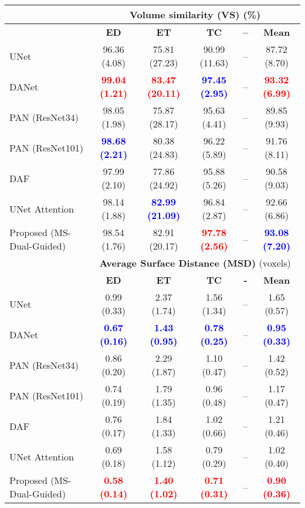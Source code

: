 \documentclass[journal]{IEEEtran}
\begin{document}
\begin{table*}[t!]
\begin{tabular}{lcccc|c}
\midrule
& \multicolumn{5}{c}{\textbf{Volume similarity (VS)} (\%)}\\
 \midrule
 & \textbf{ED} & \textbf{ET} & \textbf{TC} & \textbf{--} & \textbf{Mean}  \\
 \midrule
UNet \cite{ronneberger2015u}  &  96.36 (4.08)& 75.81 (27.23)& 90.99  (11.63)& --& 87.72 (8.70)\\
DANet \cite{fu2018dual}  &  \textcolor{red}{\textbf{99.04 (1.21)}} & \textcolor{red}{\textbf{83.47 (20.11)}}& \textcolor{blue}{\textbf{97.45 (2.95)}} & --& \textcolor{red}{\textbf{93.32 (6.99)}}  \\
PAN (ResNet34) \cite{li2018pyramid}   &  98.05 (1.98)& 75.87 (28.17)& 95.63 (4.41)& -- & 89.85 (9.93)  \\
PAN (ResNet101) \cite{li2018pyramid}   &  \textcolor{blue}{\textbf{98.68 (2.21)}} & 80.38 (24.83)& 96.22 (5.89) & -- & 91.76 (8.11)\\
DAF \cite{wang18d}  &  97.99 (2.10) & 77.86 (24.92) & 95.88 (5.26) & -- &   90.58 (9.03)  \\
UNet Attention \cite{schlemper2019attention}  &   98.14 (1.88) & \textcolor{blue}{\textbf{82.99 (21.09)}}& 96.84 (2.87) & -- &  92.66 (6.86)  \\
Proposed (MS-Dual-Guided)  & 98.54 (1.76) & 82.91 (20.17) &  \textcolor{red}{\textbf{97.78 (2.56)}} &-- & \textcolor{blue}{\textbf{93.08 (7.20)}} \\
\midrule
& \multicolumn{5}{c}{\textbf{Average Surface Distance (MSD)} (voxels)}\\
 \midrule
 & \textbf{ED} & \textbf{ET} & \textbf{TC} & \textbf{-} & \textbf{Mean}  \\
 \midrule
UNet \cite{ronneberger2015u}  & 0.99 (0.33)& 2.37 (1.74)& 1.56 (1.34)& -- & 1.65 (0.57) \\
DANet \cite{fu2018dual}  &  \textcolor{blue}{\textbf{0.67 (0.16)}} & \textcolor{blue}{\textbf{1.43 (0.95)}}& \textcolor{blue}{\textbf{0.78 (0.25)}} & -- & \textcolor{blue}{\textbf{0.95  (0.33)}}   \\
PAN (ResNet34)\cite{li2018pyramid}   & 0.86 (0.20)  & 2.29 (1.87) & 1.10 (0.47) & -- & 1.42 (0.52) \\
PAN (ResNet101) \cite{li2018pyramid}   & 0.74 (0.19)  & 1.79 (1.35) & 0.96 (0.48) & -- & 1.17 (0.47) \\
DAF \cite{wang18d}  & 0.76 (0.17) & 1.84 (1.33) & 1.02 (0.66)& -- &  1.21 (0.46)  \\
UNet Attention \cite{schlemper2019attention}  & 0.69 (0.18) & 1.58 (1.12) &  0.79 (0.29) & --&  1.02 (0.40)  \\
Proposed (MS-Dual-Guided)  & \textcolor{red}{\textbf{0.58 (0.14)}}  & \textcolor{red}{\textbf{1.40 (1.02)}}&  \textcolor{red}{\textbf{0.71 (0.31)}} & -- &  \textcolor{red}{\textbf{0.90 (0.36)}} \\
\midrule
\midrule
\end{tabular}


\end{table*}
\end{document}
